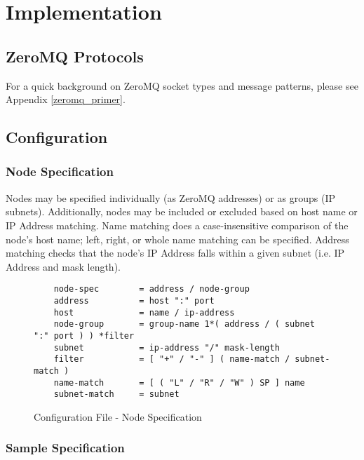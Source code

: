 \chapter{Implementation}
\label{implementation}

\section{ZeroMQ Protocols}

For a quick background on ZeroMQ socket types and message patterns, please see Appendix \ref{zeromq_primer}.






\section{Configuration}
\label{imp_configuration}

\subsection{Node Specification}

Nodes may be specified individually (as ZeroMQ addresses) or as groups (IP subnets). Additionally, nodes may be included
or excluded based on host name or IP Address matching. Name matching does a case-insensitive comparison of the node's
host name; left, right, or whole name matching can be specified. Address matching checks that the node's IP Address
falls within a given subnet (i.e. IP Address and mask length).

\begin{figure}[ht]
    \begin{lstlisting}
    node-spec        = address / node-group
    address          = host ":" port
    host             = name / ip-address
    node-group       = group-name 1*( address / ( subnet ":" port ) ) *filter
    subnet           = ip-address "/" mask-length
    filter           = [ "+" / "-" ] ( name-match / subnet-match )
    name-match       = [ ( "L" / "R" / "W" ) SP ] name
    subnet-match     = subnet
    \end{lstlisting}
    \caption{Configuration File - Node Specification}
    \label{fig:config_file_node}
\end{figure}

\subsection{Sample Specification}

